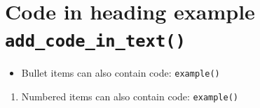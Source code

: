 \documentclass[a4paper]{report}
\begin{document}
\chapter{Code in heading example \texttt{add\_code\_in\_text()}}
\begin{itemize}
\item Bullet items can also contain code: \texttt{example()}
\end{itemize}
\begin{enumerate}
\item Numbered items can also contain code: \texttt{example()}
\end{enumerate}
\end{document}
